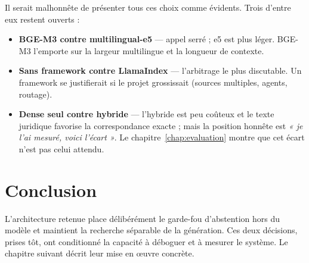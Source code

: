 Il serait malhonnête de présenter tous ces choix comme évidents. Trois d'entre eux restent
ouverts :

\begin{itemize}
    \item \textbf{BGE-M3 contre multilingual-e5} --- appel serré ; e5 est plus léger. BGE-M3
    l'emporte sur la largeur multilingue et la longueur de contexte.
    \item \textbf{Sans framework contre LlamaIndex} --- l'arbitrage le plus discutable. Un
    framework se justifierait si le projet grossissait (sources multiples, agents, routage).
    \item \textbf{Dense seul contre hybride} --- l'hybride est peu coûteux et le texte juridique
    favorise la correspondance exacte ; mais la position honnête est \emph{« je l'ai mesuré,
    voici l'écart »}. Le chapitre~\ref{chap:evaluation} montre que cet écart n'est pas celui
    attendu.
\end{itemize}

\newpage
\section*{Conclusion}

L'architecture retenue place délibérément le garde-fou d'abstention hors du modèle et maintient
la recherche séparable de la génération. Ces deux décisions, prises tôt, ont conditionné la
capacité à déboguer et à mesurer le système. Le chapitre suivant décrit leur mise en œuvre
concrète.
